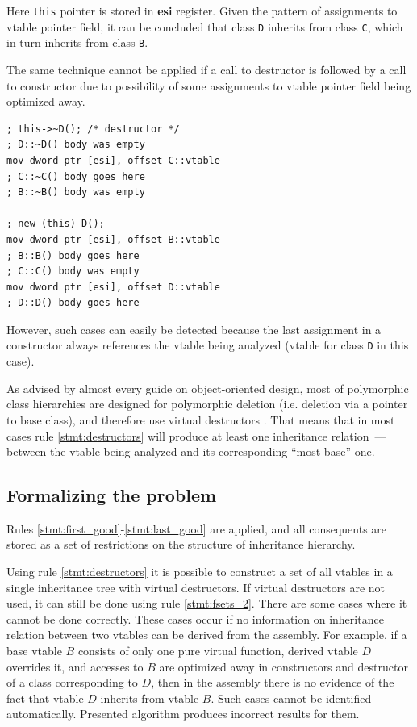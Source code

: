 \documentclass[10pt, conference]{IEEEtran}
\newcommand{\listingsize}{\normalsize}
\begin{document}
Here \lstinline{this} pointer is stored in \textbf{esi} register.
Given the pattern of assignments to vtable pointer field, it can
be concluded that class \lstinline{D} inherits from class \lstinline{C},
which in turn inherits from class \lstinline{B}.

The same technique cannot be applied if a call to
destructor is followed by a call to constructor due to possibility
of some assignments to vtable pointer field being optimized away.
{
\lstset{basicstyle=\listingsize, language=[x86masm]Assembler}
\begin{lstlisting}
; this->~D(); /* destructor */
; D::~D() body was empty
mov dword ptr [esi], offset C::vtable
; C::~C() body goes here
; B::~B() body was empty
 
; new (this) D();
mov dword ptr [esi], offset B::vtable
; B::B() body goes here
; C::C() body was empty
mov dword ptr [esi], offset D::vtable
; D::D() body goes here
\end{lstlisting}
}

However, such cases can easily be detected because the last assignment
in a constructor always references the vtable being analyzed
(vtable for class \lstinline{D} in this case).

As advised by almost every guide on object-oriented design,
most of polymorphic class hierarchies are designed for
polymorphic deletion (i.e. deletion via a pointer to base class),
and therefore use virtual destructors \cite{sutter01}.
That means that in most cases rule \ref{stmt:destructors} will produce
at least one inheritance relation~--- between the vtable being analyzed
and its corresponding ``most-base'' one.



\quad

\subsection{Formalizing the problem}\label{chapterProblem}
Rules \ref{stmt:first_good}-\ref{stmt:last_good} are applied, and all
consequents are stored as a set of restrictions on the structure of
inheritance hierarchy.

Using rule \ref{stmt:destructors}
it is possible to construct a set of all vtables
in a single inheritance tree with virtual destructors.
If virtual destructors are not used, it can
still be done using rule \ref{stmt:fsets_2}.
There are some cases where it cannot be done correctly.
These cases occur if no information on inheritance
relation between two vtables can be derived from the assembly.
For example, if a base vtable $B$ consists of only one
pure virtual function, derived vtable $D$ overrides it, and
accesses to $B$ are optimized away in constructors and destructor of a class
corresponding to $D$, 
then in the assembly there is no evidence of the fact
that vtable $D$ inherits from vtable $B$.
Such cases cannot be identified automatically.
Presented algorithm produces incorrect results for them.
\end{document}
